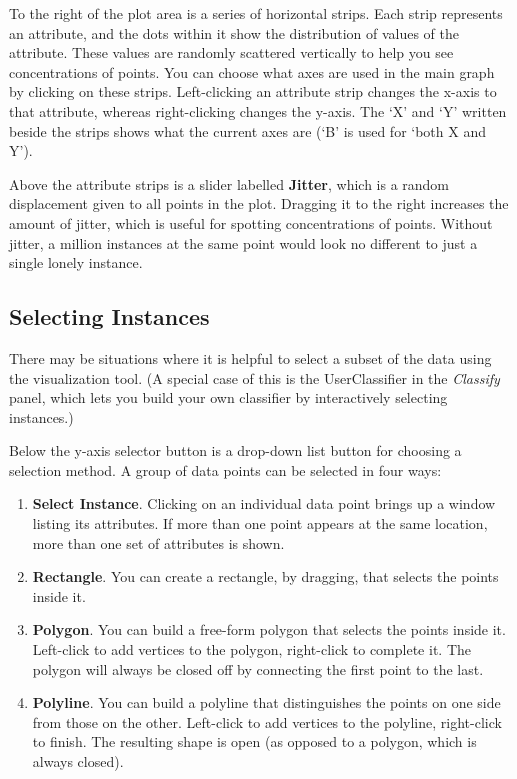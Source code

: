 \documentclass[a4paper]{article}
\begin{document}
To the right of the plot area is a series of horizontal strips. Each
strip represents an attribute, and the dots within it show the
distribution of values of the attribute.  These values are randomly
scattered vertically to help you see concentrations of points.  You
can choose what axes are used in the main graph by clicking on these
strips.  Left-clicking an attribute strip changes the x-axis to that
attribute, whereas right-clicking changes the y-axis. The `X' and `Y'
written beside the strips shows what the current axes are (`B' is used
for `both X and Y').

Above the attribute strips is a slider labelled \textbf{Jitter}, which
is a random displacement given to all points in the plot.  Dragging it
to the right increases the amount of jitter, which is useful for
spotting concentrations of points. Without jitter, a million instances
at the same point would look no different to just a single lonely
instance.

\subsection{Selecting Instances}

There may be situations where it is helpful to select a subset of the
data using the visualization tool. (A special case of this is the
UserClassifier in the {\em Classify} panel, which lets you build your
own classifier by interactively selecting instances.)

Below the y-axis selector button is a drop-down list button for choosing a
selection method.  A group of data points can be selected in four ways:

\begin{enumerate}
\item \textbf{Select Instance}.
Clicking on an individual data point brings up a window listing its attributes.
If more than one point appears at the same location, more than one set of
attributes is shown.
\item \textbf{Rectangle}.
You can create a rectangle, by dragging, that selects the points inside it.
\item \textbf{Polygon}.
You can build a free-form polygon that selects the points inside it. Left-click
to add vertices to the polygon, right-click to complete it. The polygon will
always be closed off by connecting the first point to the last.
\item \textbf{Polyline}.
You can build a polyline that distinguishes the points on one side from those
on the other. Left-click to add vertices to the polyline, right-click to
finish. The resulting shape is open (as opposed to a polygon, which is
always closed).
\end{enumerate}
\end{document}
